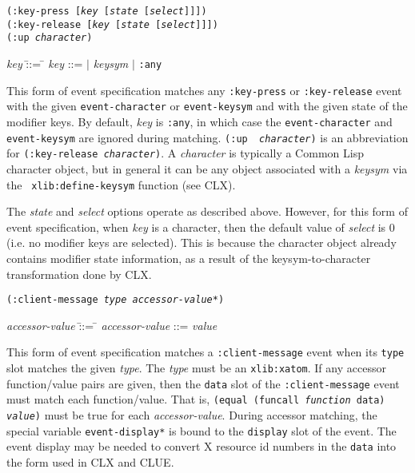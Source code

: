 \pagebreak
{\samepage
{}
{\tt (:key-press [{\em key} [{\em state} [{\em select}]]])}\\
{\tt (:key-release [{\em key} [{\em state} [{\em select}]]])}\\
{\tt (:up {\em character})}\\
\hspace*{.75in}
\parbox[t]{5.75in}{
\begin{tabbing}
{\em key} \= ::= \= \kill
{\em key}       \>::=  $|$ {\em keysym} $|$ {\tt :any} \\
\end{tabbing}}}
\begin{flushright}
\parbox[t]{5.75in}{
This
form of event specification matches any {\tt :key-press} or {\tt :key-release}
event with the given {\tt event-character} or {\tt event-keysym} and with the
given state of the modifier keys. By default, {\em key} is {\tt :any}, in which
case the {\tt event-character} and {\tt event-keysym} are ignored during
matching.
{\tt (:up {\em
character})} is an abbreviation for {\tt (:key-release {\em character})}.
A {\em character} is typically a Common Lisp character object, but in general
it can be any object associated with a {\em keysym} via the {\tt
xlib:define-keysym} function (see CLX\cite{clx}).}

\parbox[t]{5.75in}{
The {\em state} and {\em select}
options operate as described above. However, for this form of event
specification, when {\em key} is a character, then the default value of
{\em select} is 0 (i.e. no modifier keys are selected). This is because
the character object already contains modifier state information, as a
result of the keysym-to-character transformation done by CLX.
}
\end{flushright} 

{\samepage
{}
{\tt (:client-message {\em type} {\em accessor-value*})}\\
\hspace*{.75in}
\parbox[t]{5.75in}{
\begin{tabbing}
{\em accessor-value} \= ::= \= \kill
{\em accessor-value} \>::=  {\em value} \\
\end{tabbing}}
}
\begin{flushright}
\parbox[t]{5.75in}{
This
form of event specification matches a {\tt :client-message}
event when its {\tt type} slot matches the given {\em type}. The {\em
type} must be an {\tt xlib:xatom}. If
any accessor function/value pairs are
given, then the {\tt data} slot of the {\tt :client-message} event must
match each function/value. That is, {\tt (equal (funcall {\em function}
data) {\em value})} must be true for each {\em accessor-value}.
During accessor matching, the special variable {\tt *event-display*} is
bound to the {\tt display} slot of the event. The event display may be
needed to convert X resource id numbers in the {\tt data} into the form
used in CLX and CLUE.}
\end{flushright}
 
